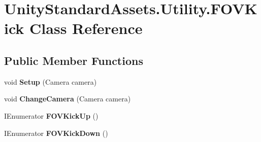 \hypertarget{class_unity_standard_assets_1_1_utility_1_1_f_o_v_kick}{}\section{Unity\+Standard\+Assets.\+Utility.\+F\+O\+V\+Kick Class Reference}
\label{class_unity_standard_assets_1_1_utility_1_1_f_o_v_kick}
\subsection*{Public Member Functions}
\begin{DoxyCompactItemize}
\item 
\mbox{\label{class_unity_standard_assets_1_1_utility_1_1_f_o_v_kick_a26b683b3b8e10bcb541c77743e2cc199}} 
void {\bfseries Setup} (Camera camera)
\item 
\mbox{\label{class_unity_standard_assets_1_1_utility_1_1_f_o_v_kick_af766e2f62e847c9e3e0a62bb9ea0b6ae}} 
void {\bfseries Change\+Camera} (Camera camera)
\item 
\mbox{\label{class_unity_standard_assets_1_1_utility_1_1_f_o_v_kick_abb86a74e68394ce9cdeff6864d30009f}} 
I\+Enumerator {\bfseries F\+O\+V\+Kick\+Up} ()
\item 
\mbox{\label{class_unity_standard_assets_1_1_utility_1_1_f_o_v_kick_a1f286392456ee5b0a63f506c80f2e101}} 
I\+Enumerator {\bfseries F\+O\+V\+Kick\+Down} ()
\end{DoxyCompactItemize}
